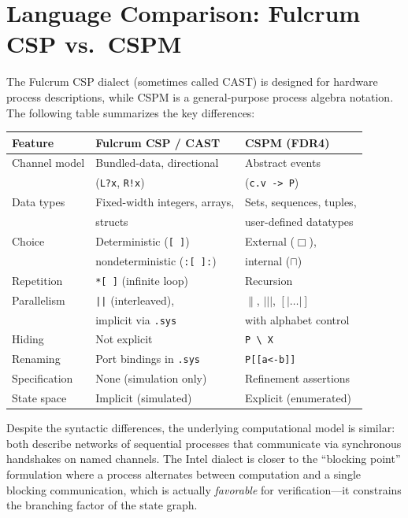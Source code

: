 \documentclass[11pt]{article}
\begin{document}
\section{Language Comparison: Fulcrum CSP vs.\ CSPM}

The Fulcrum CSP dialect (sometimes called CAST) is designed for
hardware process descriptions, while CSPM is a general-purpose
process algebra notation.  The following table summarizes the key
differences:

\begin{center}
\begin{tabular}{lll}
\toprule
\textbf{Feature} & \textbf{Fulcrum CSP / CAST} & \textbf{CSPM (FDR4)} \\
\midrule
Channel model     & Bundled-data, directional & Abstract events \\
                  & (\texttt{L?x}, \texttt{R!x}) & (\texttt{c.v -> P}) \\
Data types        & Fixed-width integers, arrays, & Sets, sequences, tuples, \\
                  & structs & user-defined datatypes \\
Choice            & Deterministic (\texttt{[\,]}) & External ($\Box$), \\
                  & nondeterministic (\texttt{:[\,]:}) & internal ($\sqcap$) \\
Repetition        & \texttt{*[\,]} (infinite loop) & Recursion \\
Parallelism       & \texttt{||} (interleaved), & $\|$, $|||$, $[|\ldots|]$ \\
                  & implicit via \texttt{.sys} & with alphabet control \\
Hiding            & Not explicit & \texttt{P \textbackslash\ X} \\
Renaming          & Port bindings in \texttt{.sys} & \texttt{P[[a<-b]]} \\
Specification     & None (simulation only) & Refinement assertions \\
State space       & Implicit (simulated) & Explicit (enumerated) \\
\bottomrule
\end{tabular}
\end{center}

Despite the syntactic differences, the underlying computational model
is similar: both describe networks of sequential processes that
communicate via synchronous handshakes on named channels.  The Intel
dialect is closer to the ``blocking point'' formulation where a process
alternates between computation and a single blocking communication,
which is actually \emph{favorable} for verification---it constrains
the branching factor of the state graph.
\end{document}
